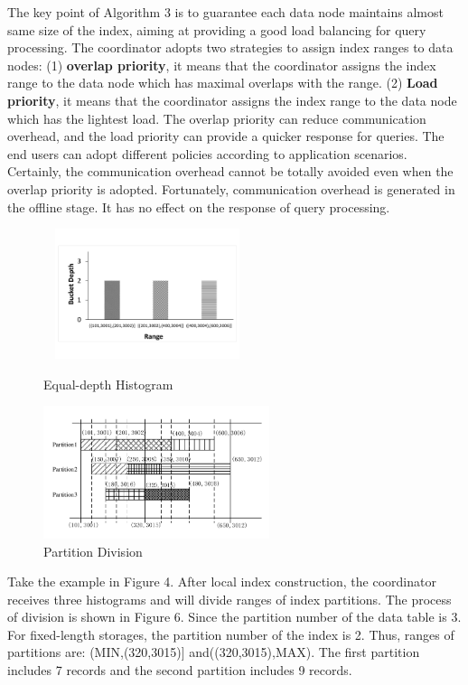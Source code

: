 The key point of Algorithm 3 is to guarantee each data node maintains almost same size of the index, aiming at providing a good load balancing for query processing. The coordinator adopts two strategies to assign index ranges to data nodes: (1) \textbf{overlap priority}, it means that the coordinator assigns the index range to the data node which has maximal overlaps with the range. (2) \textbf{Load priority}, it means that the coordinator assigns the index range to the data node which has the lightest load. The overlap priority can reduce communication overhead, and the load priority can provide a quicker response for queries. The end users can adopt different policies according to application scenarios.
Certainly, the communication overhead cannot be totally avoided even when the overlap priority is adopted. Fortunately, communication overhead is generated in the offline stage. It has no effect on the response of query processing.

\vspace{-0.7cm}
\begin{figure}
	\begin{minipage}[t]{0.5\linewidth}
		\centering
		\includegraphics[width=2.4in,height=1.5in]{articlegraph/sample.pdf}
		\caption{Equal-depth Histogram}
		\label{fig:side:a}
	\end{minipage}%
	\begin{minipage}[t]{0.5\linewidth}
		\centering
		\includegraphics[width=2.6in]{articlegraph/divide.pdf}
		\caption{Partition Division}
		\label{fig:side:b}
	\end{minipage}
\end{figure}
\vspace{-0.7cm}

\begin{example}
	Take the example in Figure 4. After local index construction, the coordinator receives three histograms and will divide ranges of index partitions. The process of division is shown in Figure 6. Since the partition number of the data table is 3. For fixed-length storages, the partition  number of the index is 2. Thus, ranges of partitions are: (MIN,(320,3015)] and((320,3015),MAX). The first partition includes 7 records and the second partition includes 9 records.
\end{example}

